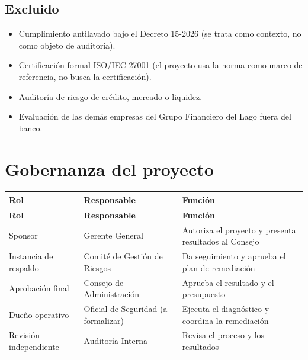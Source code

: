 \documentclass[11pt,a4paper]{article}
\begin{document}
	\subsection{Excluido}
	
	\begin{itemize}[leftmargin=1.5em]
		\item Cumplimiento antilavado bajo el Decreto 15-2026 (se trata como contexto, no como objeto de auditoría).
		\item Certificación formal ISO/IEC 27001 (el proyecto usa la norma como marco de referencia, no busca la certificación).
		\item Auditoría de riesgo de crédito, mercado o liquidez.
		\item Evaluación de las demás empresas del Grupo Financiero del Lago fuera del banco.
	\end{itemize}
	
	
	\section{Gobernanza del proyecto}
	
	\begin{longtable}{@{}p{3.5cm}p{4.25cm}p{6cm}@{}}
		\toprule
		\textbf{Rol} & \textbf{Responsable} & \textbf{Función} \\ \midrule
		\endfirsthead
		\toprule
		\textbf{Rol} & \textbf{Responsable} & \textbf{Función} \\ \midrule
		\endhead
		Sponsor & Gerente General & Autoriza el proyecto y presenta resultados al Consejo \\
		Instancia de respaldo & Comité de Gestión de Riesgos & Da seguimiento y aprueba el plan de remediación \\
		Aprobación final & Consejo de Administración & Aprueba el resultado y el presupuesto \\
		Dueño operativo & Oficial de Seguridad (a formalizar) & Ejecuta el diagnóstico y coordina la remediación \\
		Revisión independiente & Auditoría Interna & Revisa el proceso y los resultados \\ \bottomrule
	\end{longtable}
	
	
\end{document}

